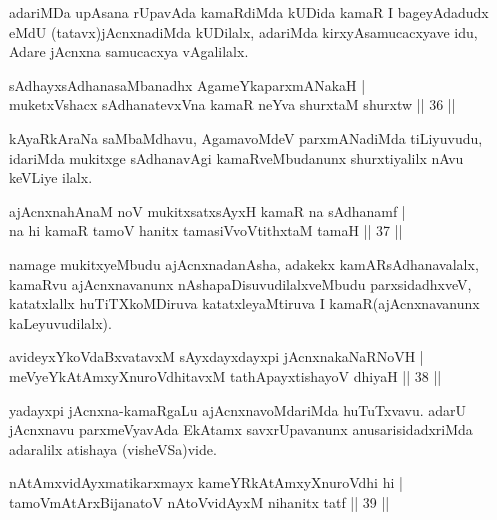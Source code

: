 \begin{artha}
adariMDa upAsana rUpavAda kamaRdiMda kUDida kamaR I bageyAdadudx eMdU (tatavx)jAcnxnadiMda kUDilalx, adariMda kirxyAsamucacxyave idu, Adare jAcnxna samucacxya vAgalilalx.
\end{artha}


\begin{shl}
sAdhayxsAdhanasaMbanadhx AgameYkaparxmANakaH |\\
muketxVshacx sAdhanatevxVna kamaR neYva shurxtaM shurxtw \hfill || 36 ||
\end{shl}

\begin{artha}
kAyaRkAraNa saMbaMdhavu, AgamavoMdeV parxmANadiMda tiLiyuvudu, idariMda mukitxge sAdhanavAgi kamaRveMbudanunx shurxtiyalilx nAvu keVLiye ilalx.
\end{artha}


\begin{shl}
ajAcnxnahAnaM noV mukitxsatxsAyxH kamaR na sAdhanamf |\\
na hi kamaR tamoV hanitx tamasiVvoVtithxtaM tamaH \hfill || 37 ||
\end{shl}

\begin{artha}
namage mukitxyeMbudu ajAcnxnadanAsha, adakekx kamARsAdhanavalalx, kamaRvu ajAcnxnavanunx nAshapaDisuvudilalxveMbudu parxsidadhxveV, katatxlallx huTiTXkoMDiruva katatxleyaMtiruva I kamaR(ajAcnxnavanunx kaLeyuvudilalx).
\end{artha}


\begin{shl}
avideyxYkoVdaBxvatavxM sAyxdayxdayxpi jAcnxnakaNaRNoVH |\\
meVyeYkAtAmxyXnuroVdhitavxM tathA\s payxtishayoV dhiyaH \hfill || 38 ||
\end{shl}

\begin{artha}
yadayxpi jAcnxna-kamaRgaLu ajAcnxnavoMdariMda huTuTxvavu. adarU jAcnxnavu parxmeVyavAda EkAtamx savxrUpavanunx anusarisidadxriMda adaralilx atishaya (visheVSa)vide.
\end{artha}

\begin{shl}
nA\s \s tAmxvidAyxmatikarxmayx kameYRkAtAmxyXnuroVdhi hi |\\
tamoVmAtArxBijanatoV nAtoV\s vidAyxM nihanitx tatf \hfill || 39 ||
\end{shl}

